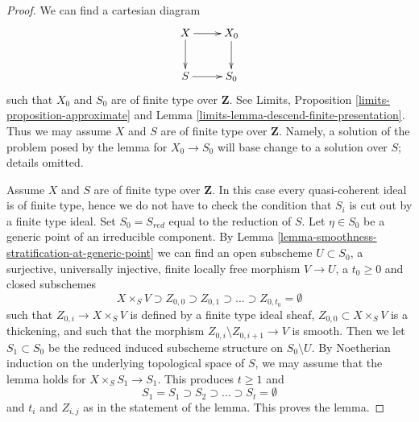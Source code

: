 \documentclass[10pt,a4paper]{amsart}
\theoremstyle{plain}
\theoremstyle{definition}
\theoremstyle{remark}
\numberwithin{equation}{subsection}
\begin{document}
\begin{proof}
We can find a cartesian diagram
$$
\xymatrix{
X \ar[d] \ar[r] & X_0 \ar[d] \\
S \ar[r] & S_0
}
$$
such that $X_0$ and $S_0$ are of finite type over $\mathbf{Z}$. See
Limits, Proposition \ref{limits-proposition-approximate} and
Lemma \ref{limits-lemma-descend-finite-presentation}.
Thus we may assume $X$ and $S$ are of finite type over $\mathbf{Z}$.
Namely, a solution of the problem posed by the lemma for $X_0 \to S_0$
will base change to a solution over $S$; details omitted.

\medskip\noindent
Assume $X$ and $S$ are of finite type over $\mathbf{Z}$.
In this case every quasi-coherent ideal is of finite type, hence
we do not have to check the condition that $S_i$ is cut out
by a finite type ideal. Set $S_0 = S_{red}$ equal to the reduction of $S$.
Let $\eta \in S_0$ be a generic point of an irreducible component.
By Lemma \ref{lemma-smoothness-stratification-at-generic-point}
we can find an open subscheme $U \subset S_0$, 
a surjective, universally injective, finite locally free
morphism $V \to U$, a $t_0 \geq 0$ and closed subschemes
$$
X \times_S V \supset Z_{0, 0} \supset Z_{0, 1} \supset \ldots \supset
Z_{0, t_0} = \emptyset
$$
such that $Z_{0, i} \to X \times_S V$ is defined by a finite type ideal sheaf,
$Z_{0, 0} \subset X \times_S V$ is a thickening, and such that the morphism
$Z_{0, i} \setminus Z_{0, i + 1} \to V$ is smooth.
Then we let $S_1 \subset S_0$ be the reduced induced subscheme structure
on $S_0 \setminus U$. By Noetherian induction on the underlying
topological space of $S$, we may assume that the lemma holds for
$X \times_S S_1 \to S_1$. This produces $t \geq 1$ and
$$
S_1 = S_1 \supset S_2 \supset \ldots \supset S_t = \emptyset
$$
and $t_i$ and $Z_{i, j}$ as in the statement of the lemma.
This proves the lemma.
\end{proof}
\end{document}

